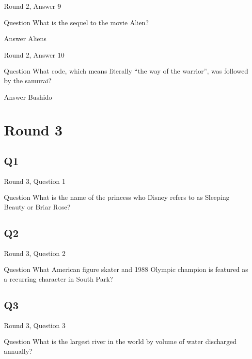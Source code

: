 \documentclass[11pt]{beamer}
\begin{document}
\begin{frame}[t]{Round 2, Answer 9}
\vspace{2em}
\begin{block}{Question}
What is the sequel to the movie Alien\@?
\end{block}
\pause{}
\begin{block}{Answer}
Aliens
\end{block}
\end{frame}
    

\begin{frame}[t]{Round 2, Answer 10}
\vspace{2em}
\begin{block}{Question}
What code, which means literally ``the way of the warrior'', was followed by the samurai\@?
\end{block}
\pause{}
\begin{block}{Answer}
Bushido
\end{block}
\end{frame}
    

\section{Round 3}
    

\subsection*{Q1}
\begin{frame}[t]{Round 3, Question 1}
\vspace{2em}
\begin{block}{Question}
What is the name of the princess who Disney refers to as Sleeping Beauty or Briar Rose\@?
\end{block}
\end{frame}
    

\subsection*{Q2}
\begin{frame}[t]{Round 3, Question 2}
\vspace{2em}
\begin{block}{Question}
What American figure skater and 1988 Olympic champion is featured as a recurring character in South Park\@?
\end{block}
\end{frame}
    

\subsection*{Q3}
\begin{frame}[t]{Round 3, Question 3}
\vspace{2em}
\begin{block}{Question}
What is the largest river in the world by volume of water discharged annually\@?
\end{block}
\end{frame}
    
\end{document}
